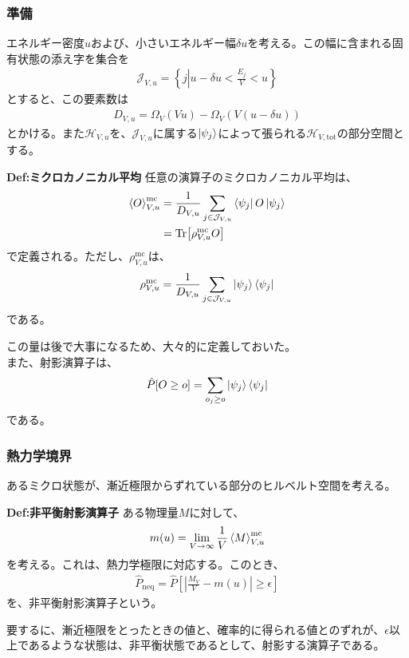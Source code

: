 \documentclass[a4paper,11pt]{jsarticle}
\numberwithin{equation}{section}
\begin{document}
\subsubsection{準備}
エネルギー密度$u$および、小さいエネルギー幅$\delta u$を考える。この幅に含まれる固有状態の添え字を集合を
\begin{align}
  \mathcal{J}_{V,u} = \left\{ j \left| u - \delta u < \frac{E_j}{V} < u\right. \right\}
\end{align}
とすると、この要素数は
\begin{align}
  D_{V,u} = \Omega_V (Vu) - \Omega_V(V(u-\delta u))
\end{align}
とかける。また$\mathcal{H}_{V,u}$を、$\mathcal{J}_{V,u}$に属する$\ket{\psi_j}$によって張られる$\mathcal{H}_{V,\text{tot}}$の部分空間とする。

\begin{itembox}[l]{\textbf{Def:ミクロカノニカル平均}}
  任意の演算子のミクロカノニカル平均は、
  \begin{align}
    \expval{O}_{V,u}^{\text{mc}} &= \frac{1}{D_{V,u}}\sum_{j\in \mathcal{J}_{V,u}}\bra{\psi_j}O\ket{\psi_j}\\
    &= \Tr[\rho_{V,u}^{\text{mc}}O]
  \end{align}
  で定義される。ただし、$\rho_{V,u}^{\text{mc}}$は、
  \begin{align}
    \rho_{V,u}^{\text{mc}} = \frac{1}{D_{V,u}}\sum_{j\in \mathcal{J}_{V,u}}\ket{\psi_j}\bra{\psi_j}
  \end{align}
  である。
\end{itembox}
この量は後で大事になるため、大々的に定義しておいた。\\

また、射影演算子は、
\begin{align}
  \hat{P}[O \geq o] = \sum_{o_j \geq o} \ket{\psi_j}\bra{\psi_j}
\end{align}
である。\\

\subsubsection{熱力学境界}
あるミクロ状態が、漸近極限からずれている部分のヒルベルト空間を考える。
\begin{itembox}[l]{\textbf{Def:非平衡射影演算子}}
  ある物理量$M$に対して、
  \begin{align}
    m(u) = \lim_{V\to \infty}\frac{1}{V}\expval{M}^{\text{mc}}_{V,u}
  \end{align}
  を考える。これは、熱力学極限に対応する。このとき、
  \begin{align}
    \hat{P}_{\text{neq}} = \hat{P}\left[\left| \frac{M_V}{V} - m(u) \right| \geq \epsilon\right]
  \end{align}
  を、非平衡射影演算子という。
\end{itembox}
要するに、漸近極限をとったときの値と、確率的に得られる値とのずれが、$\epsilon$以上であるような状態は、非平衡状態であるとして、射影する演算子である。\\  
\end{document}

